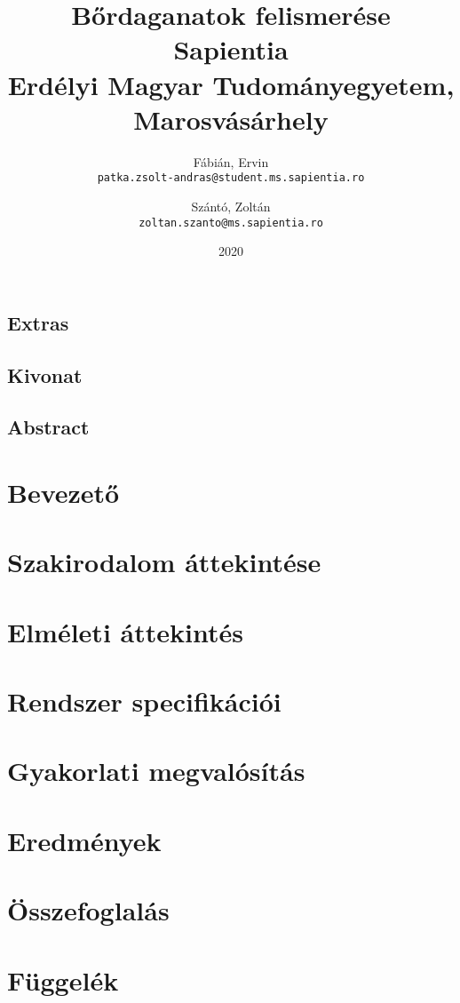 \documentclass[12pt, twosides]{report}
\title{
	{Bőrdaganatok felismerése}\\
	{\large Sapientia\\
	Erdélyi Magyar Tudományegyetem, Marosvásárhely}
}
\author{
	Fábián, Ervin\\
	\texttt{patka.zsolt-andras@student.ms.sapientia.ro}
	\and
	Szántó, Zoltán\\
	\texttt{zoltan.szanto@ms.sapientia.ro}	
}
\date{2020}
\begin{document}


\section*{Extras}

\pagebreak



\section*{Kivonat}

\pagebreak

\section*{Abstract}

\pagebreak


\tableofcontents

\listoffigures

\chapter{Bevezető}


\chapter{Szakirodalom áttekintése}


\chapter{Elméleti áttekintés}


\chapter{Rendszer specifikációi}


\chapter{Gyakorlati megvalósítás} \label{chpt:implementation}


\chapter{Eredmények}


\chapter{Összefoglalás}





\appendix
\chapter{Függelék}

\end{document}
